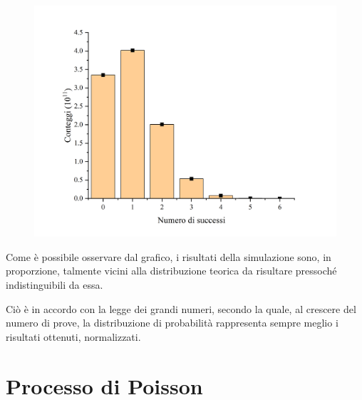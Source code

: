 \documentclass{article}
\begin{document}
\begin{center}
    \begin{figure}[H]
        \includegraphics[trim={2cm .5cm 2cm 2.1cm},clip,width=\textwidth]{img/DadiSimul.png}
    \end{figure}
\end{center}

Come è possibile osservare dal grafico, i risultati della simulazione sono, in proporzione,
talmente vicini alla distribuzione teorica da risultare pressoché indistinguibili da essa.

Ciò è in accordo con la legge dei grandi numeri, secondo la quale, al crescere del
numero di prove, la distribuzione di probabilità rappresenta sempre meglio i
risultati ottenuti, normalizzati.

\pagebreak
\section{Processo di Poisson}
\end{document}
